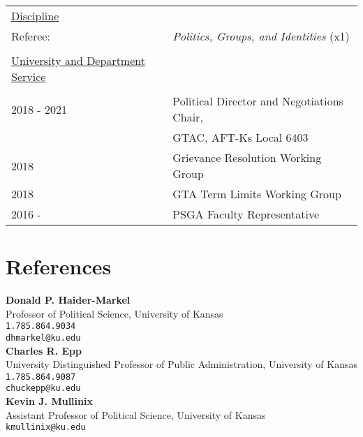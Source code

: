 \documentclass[margin,line,pifont,palatino,courier]{res}
\begin{document}
\begin{resume}
\begin{tabular}{@{}p{0.8in}p{4in}}
  \\
  \underline{Discipline} &\\
  Referee: & \textit{Politics, Groups, and Identities} (x1) \\
  \\
  \underline{University and Department Service} &\\
  \\
  2018 - 2021 & Political Director and Negotiations Chair,\\
              &  GTAC, AFT-Ks Local 6403 \\
  2018 & Grievance Resolution Working Group \\
  2018 & GTA Term Limits Working Group\\
  2016 - & PSGA Faculty Representative\\
\end{tabular}


\section{\sc References}

\textbf{Donald P. Haider-Markel} \\
Professor of Political Science, University of Kansas \\
\verb+1.785.864.9034+\\
\texttt{dhmarkel@ku.edu}\\



\textbf{Charles R. Epp} \\
University Distinguished Professor of Public Administration, University of Kansas \\
\verb+1.785.864.9087+\\
\texttt{chuckepp@ku.edu}\\

\textbf{Kevin J. Mullinix} \\
Assistant Professor of Political Science, University of Kansas \\
\texttt{kmullinix@ku.edu}\\

\end{resume}
\end{document}
